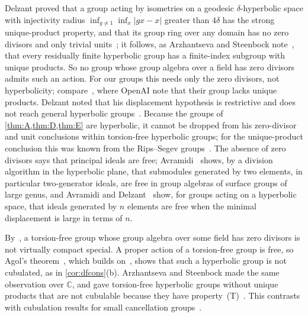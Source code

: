 \documentclass[11pt]{article}
\theoremstyle{definition}
\theoremstyle{plain}
\newcommand{\C}{\mathbb{C}}
\begin{document}
\begin{remark}\label{rem:delzant}
Delzant proved that a group acting by isometries on a geodesic $\delta$-hyperbolic space with injectivity radius $\inf_{g\neq1}\inf_x|gx-x|$ greater than $4\delta$ has the strong unique-product property, and that its group ring over any domain has no zero divisors and only trivial units~\cite[Th\'eor\`eme and Proposition, p.~382]{Delzant1997}; it follows, as Arzhantseva and Steenbock note~\cite[\S6]{ArzhantsevaSteenbock}, that every residually finite hyperbolic group has a finite-index subgroup with unique products. So no group whose group algebra over a field has zero divisors admits such an action. For our groups this needs only the zero divisors, not hyperbolicity; compare~\cite[\S6]{OAI196}, where OpenAI note that their group lacks unique products. Delzant noted that his displacement hypothesis is restrictive and does not reach general hyperbolic groups~\cite[Remarques, p.~382]{Delzant1997}. Because the groups of \cref{thm:A,thm:D,thm:E} are hyperbolic, it cannot be dropped from his zero-divisor and unit conclusions within torsion-free hyperbolic groups; for the unique-product conclusion this was known from the Rips--Segev groups~\cite{RipsSegev1987,Steenbock2015}. The absence of zero divisors says that principal ideals are free; Avramidi~\cite{Avramidi2022} shows, by a division algorithm in the hyperbolic plane, that submodules generated by two elements, in particular two-generator ideals, are free in group algebras of surface groups of large genus, and Avramidi and Delzant~\cite{AvramidiDelzant2023} show, for groups acting on a hyperbolic space, that ideals generated by $n$ elements are free when the minimal displacement is large in terms of $n$.
\end{remark} By~\cite[Thm.~1.3(1)]{FisherSanchezPeralta2026}, a torsion-free group whose group algebra over some field has zero divisors is not virtually compact special. A proper action of a torsion-free group is free, so Agol's theorem~\cite{Agol2013}, which builds on~\cite{HaglundWise2008}, shows that such a hyperbolic group is not cubulated, as in \cref{cor:dfcons}(b). Arzhantseva and Steenbock made the same observation over $\C$, and gave torsion-free hyperbolic groups without unique products that are not cubulable because they have property~(T)~\cite[\S6]{ArzhantsevaSteenbock}. This contrasts with cubulation results for small cancellation groups~\cite{Wise2004,MartinSteenbock2017}.
\end{document}
